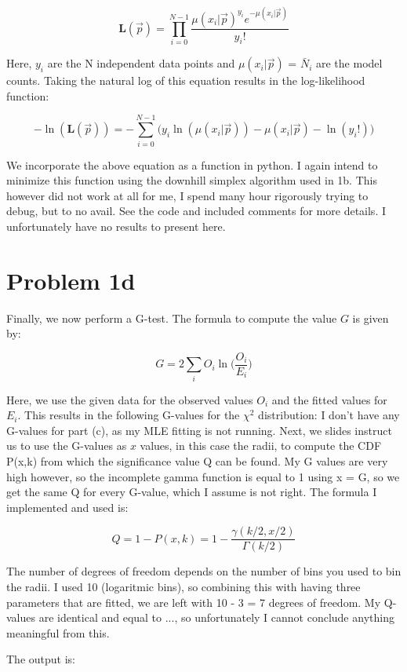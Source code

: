 \begin{equation}
	\textbf{L}(\vec{p}) = \prod_{i=0}^{N-1} \frac{\mu(x_i | \vec{p})^{y_i} e^{-\mu(x_i | \vec{p})}}{y_i!}
\end{equation}

Here, $y_i$ are the N independent data points and $\mu(x_i | \vec{p})$ = $\bar{N}_i$ are the model counts. Taking the natural log of this equation results in the log-likelihood function:

\begin{equation}
	- \ln(\textbf{L}(\vec{p})) = - \sum_{i=0}^{N-1} \Big( y_i \ln (\mu(x_i | \vec{p})) - \mu(x_i | \vec{p}) - \ln(y_i!) \Big)
\end{equation}	

We incorporate the above equation as a function in python. I again intend to minimize this function using the downhill simplex algorithm used in 1b. This however did not work at all for me, I spend many hour rigorously trying to debug, but to no avail. See the code and included comments for more details. I unfortunately have no results to present here. 

\section*{Problem 1d}

Finally, we now perform a G-test. The formula to compute the value $G$ is given by:

\begin{equation}
	G = 2 \sum_{i} O_i \ln\Big( \frac{O_i}{E_i}\Big)
\end{equation}

Here, we use the given data for the observed values $O_i$ and the fitted values for $E_i$. This results in the following G-values for the $\chi^2$ distribution:
I don't have any G-values for part (c), as my MLE fitting is not running. Next, we slides instruct us to use the G-values as $x$ values, in this case the radii, to compute the CDF P(x,k) from which the significance value Q can be found. My G values are very high however, so the incomplete gamma function is equal to 1 using x = G, so we get the same Q for every G-value, which I assume is not right. The formula I implemented and used is:

\begin{equation}
	Q = 1 - P(x,k) = 1 - \frac{\gamma (k/2 , x/2)}{\Gamma (k/2)}
\end{equation}

The number of degrees of freedom depends on the number of bins you used to bin the radii. I used 10 (logaritmic bins), so combining this with having three parameters that are fitted, we are left with 10 - 3 = 7 degrees of freedom. My Q-values are identical and equal to ..., so unfortunately I cannot conclude anything meaningful from this. 

The output is:\\


















